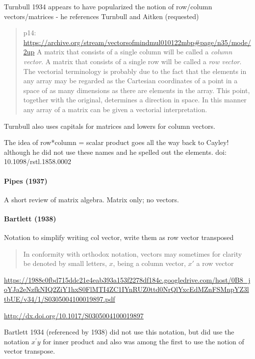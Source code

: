 Turnbull 1934 appears to have popularized the notion of row/column vectors/matrices - he references Turnbull and Aitken (requested)

\begin{quote}
p14: \url{https://archive.org/stream/vectorsofmindmul010122mbp#page/n35/mode/2up}
A matrix that consists of a single column will be called a \textit{column vector}. A
matrix that consists of a single row will be called a \textit{row vector}. The
vectorial terminology is probably due to the fact that the elements in any
array may be regarded as the Cartesian coordinates of a point in a space of as
many dimensions as there are elements in the array. This point, together with
the original, determines a direction in space. In this manner any array of a
matrix can be given a vectorial interpretation.
\end{quote}

Turnbull also uses capitals for matrices and lowers for column vectors.

The idea of row*column = scalar product goes all the way back to Cayley! although he did not use these names and he spelled out the elements.
doi: 10.1098/rstl.1858.0002

\paragraph{Pipes (1937)~\cite{Pipes1937}}

A short review of matrix algebra. Matrix only; no vectors.


\paragraph{Bartlett (1938)}

Notation to simplify writing col vector, write them as row vector transposed

\begin{quote}
In conformity with orthodox notation, vectors may sometimes for clarity be
denoted by small letters, $x$, being a column vector, $x'$ a row vector
\end{quote}

\url{https://1988c0fbd715ddc21e4eab393a153f2278df184c.googledrive.com/host/0B8_joYJa2eNzfkNIQ2ZiY1hxS0FlMTI4ZC1IYnRUZ0ttd0NrQlYxcEdMZnFSMnpYZ3ltbUE/v34/1/S0305004100019897.pdf}

\url{http://dx.doi.org/10.1017/S0305004100019897}

Bartlett 1934 (referenced by 1938) did not use this notation, but did use the
notation $x^\prime y$ for inner product and also was among the first to use the
notion of vector transpose.

